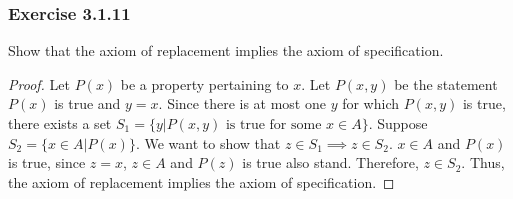 \documentclass[12pt, letter]{article}
\begin{document}
\subsubsection*{Exercise 3.1.11}
Show that the axiom of replacement implies the axiom of specification.
\begin{proof}
    Let $P(x)$ be a property pertaining to $x$. Let $P(x,y)$ be the statement $P(x)$ is true and $y = x$. Since there is at most one $y$ for which $P(x,y)$ is true, there exists a set 
    $S_1=\{y|P(x,y)\text{ is true for some }x\in A\}$. Suppose $S_2=\{x\in A| P(x)\}$. We want to show that $z\in S_1\implies z\in S_2$. $x\in A$ and $P(x)$ is true, since $z=x$, $z\in A$ and $P(z)$ is true also stand. 
    Therefore, $z\in S_2$. Thus, the axiom of replacement implies the axiom of specification.
\end{proof}
\end{document}
